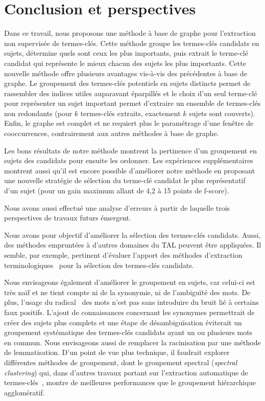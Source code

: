 \section{Conclusion et perspectives}
\label{sec:conclusion_et_perspectives}
  Dans ce travail, nous proposons une méthode à base de graphe pour l'extraction
  non supervisée de termes-clés. Cette méthode groupe les termes-clés candidats
  en sujets, détermine quels sont ceux les plus importants, puis extrait le
  terme-clé candidat qui représente le mieux chacun des sujets les plus
  importants. Cette nouvelle méthode offre plusieurs avantages vis-à-vis des
  précédentes à base de graphe. Le groupement des termes-clés potentiels en
  sujets distincts permet de rassembler des indices utiles auparavant éparpillés
  et le choix d'un seul terme-clé pour représenter un sujet important permet
  d'extraire un ensemble de termes-clés non redondants (pour $k$ termes-clés
  extraits, exactement $k$ sujets sont couverts). Enfin, le graphe est complet
  et ne requiert plus le paramétrage d'une fenêtre de cooccurrences,
  contrairement aux autres méthodes à base de graphe.

  Les bons résultats de notre méthode montrent la pertinence d'un groupement en
  sujets des candidats pour ensuite les ordonner. Les expériences
  supplémentaires montrent aussi qu'il est encore possible d'améliorer notre
  méthode en proposant une nouvelle stratégie de sélection du terme-clé candidat
  le plus représentatif d'un sujet (pour un gain maximum allant de 4,2 à 15
  points de f-score).

  Nous avons aussi effectué une analyse d'erreurs à partir de laquelle trois
  perspectives de travaux futurs émergent.

  Nous avons pour objectif d'améliorer la sélection des termes-clés candidats.
  Aussi, des méthodes empruntées à d'autres domaines du TAL peuvent être
  appliquées. Il semble, par exemple, pertinent d'évaluer l'apport des méthodes
  d'extraction terminologiques~\cite{castellvi2001automatictermdetection} pour
  la sélection des termes-clés candidats.
  
  Nous envisageons également d'améliorer le groupement en sujets,
  car celui-ci est très naïf et ne tient compte ni de la synonymie, ni de
  l'ambiguïté des mots. De plus, l'usage du
  radical~\cite{porter1980suffixstripping} des mots n'est pas sans introduire du
  bruit lié à certains faux positifs. L'ajout de connaissances concernant les
  synonymes permettrait de créer des sujets plus complets et une étape de
  désambiguïsation éviterait un groupement systématique des termes-clés
  candidats ayant un ou plusieurs mots en commun. Nous envisageons aussi de
  remplacer la racinisation par une
  méthode de lemmatisation. D'un point de vue plus technique, il faudrait
  explorer différentes méthodes de groupement, dont le groupement spectral
  (\textit{spectral clustering}) qui, dans d'autres travaux portant sur
  l'extraction automatique de termes-clés~\cite{liu2009keycluster}, montre de
  meilleures performances que le groupement hiérarchique agglomératif.

